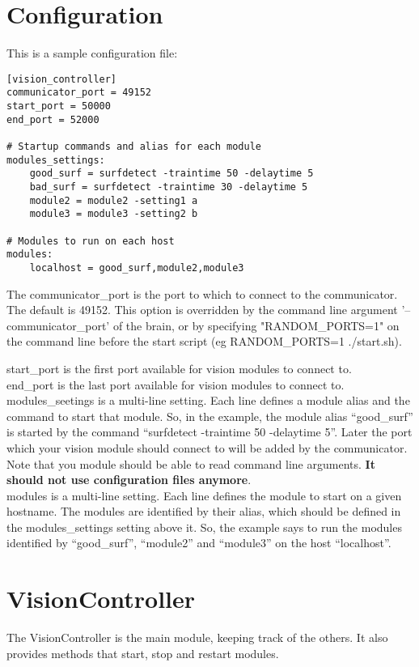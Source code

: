 \documentclass[a4paper, 10pt, oneside]{article}
\begin{document}
\section{Configuration}
This is a sample configuration file: \\

\begin{lstlisting}
[vision_controller]
communicator_port = 49152
start_port = 50000
end_port = 52000

# Startup commands and alias for each module
modules_settings:
    good_surf = surfdetect -traintime 50 -delaytime 5
    bad_surf = surfdetect -traintime 30 -delaytime 5
    module2 = module2 -setting1 a
    module3 = module3 -setting2 b

# Modules to run on each host
modules:
    localhost = good_surf,module2,module3
\end{lstlisting}

The communicator\_port is the port to which to connect to the communicator.
The default is 49152. This option is overridden by the command line argument
'--communicator\_port' of the brain, or by specifying "RANDOM\_PORTS=1" on the
command line before the start script (eg RANDOM\_PORTS=1 ./start.sh).

start\_port is the first port available for vision modules to connect to. \\

end\_port is the last port available for vision modules to connect to. \\

modules\_seetings is a multi-line setting. Each line defines a module alias and
the command to start that module. So, in the example, the module alias
``good\_surf'' is started by the command ``surfdetect -traintime 50 -delaytime
5''. Later the port which your vision module should connect to will be added by
the communicator. Note that you module should be able to read command line
arguments. \textbf{It should not use configuration files anymore}.\\

modules is a multi-line setting. Each line defines the module to start on a
given hostname. The modules are identified by their alias, which should be
defined in the modules\_settings setting above it. So, the example says to run
the modules identified by ``good\_surf'', ``module2'' and ``module3'' on the host
``localhost''. \\

\section{VisionController}
The VisionController is the main module, keeping track of the others. It also
provides methods that start, stop and restart modules. \\
\end{document}
